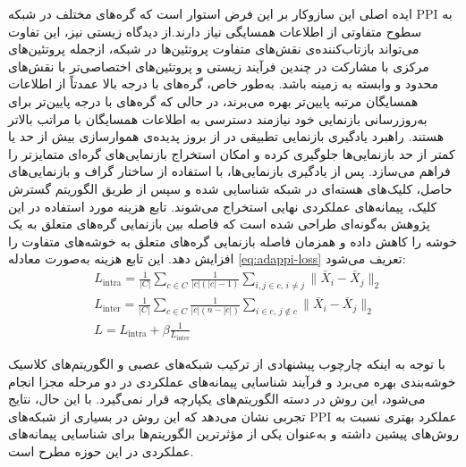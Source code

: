 ایده اصلی این سازوکار بر این فرض استوار است که گره‌های مختلف در شبکه PPI به سطوح متفاوتی از اطلاعات همسایگی نیاز دارند.از دیدگاه زیستی نیز، این تفاوت می‌تواند بازتاب‌کننده‌ی نقش‌های متفاوت پروتئین‌ها در شبکه، ازجمله پروتئین‌های مرکزی با مشارکت در چندین فرآیند زیستی و پروتئین‌های اختصاصی‌تر با نقش‌های محدود و وابسته به زمینه باشد. به‌طور خاص، گره‌های با درجه بالا عمدتاً از اطلاعات همسایگان مرتبه پایین‌تر بهره می‌برند، در حالی که گره‌های با درجه پایین‌تر برای به‌روزرسانی بازنمایی خود نیازمند دسترسی به اطلاعات همسایگان با مراتب بالاتر هستند. راهبرد یادگیری بازنمایی تطبیقی در  از بروز پدیده‌ی هموارسازی بیش از حد یا کمتر از حد بازنمایی‌ها جلوگیری کرده و امکان استخراج بازنمایی‌های گره‌ای متمایزتر را فراهم می‌سازد.
پس از یادگیری بازنمایی‌ها، با استفاده از ساختار گراف و بازنمایی‌های حاصل، کلیک‌های هسته‌ای در شبکه شناسایی شده و سپس از طریق الگوریتم گسترش کلیک، پیمانه‌های عملکردی نهایی استخراج می‌شوند. تابع هزینه مورد استفاده در این پژوهش به‌گونه‌ای طراحی شده است که فاصله بین بازنمایی گره‌های متعلق به یک خوشه را کاهش داده و همزمان فاصله بازنمایی گره‌های متعلق به خوشه‌های متفاوت را افزایش دهد. این تابع هزینه به‌صورت معادله \ref{eq:adappi-loss} تعریف می‌شود:
\begin{equation}
	\begin{aligned}
		& L_{\text{intra}} = \frac{1}{|C|} \sum_{c \in C} \frac{1}{|c|(|c|-1)} \sum_{i,j \in c,\, i \neq j} \lVert \bar{X}_i - \bar{X}_j \rVert_2 \\
		& L_{\text{inter}} = \frac{1}{|C|} \sum_{c \in C} \frac{1}{|c|(n-|c|)} \sum_{i \in c,\, j \notin c} \lVert \bar{X}_i - \bar{X}_j \rVert_2 \\
		& L = L_{\text{intra}} + \beta \frac{1}{L_{\text{inter}}}
	\end{aligned}
	\label{eq:adappi-loss}
\end{equation}

با توجه به اینکه چارچوب پیشنهادی  از ترکیب شبکه‌های عصبی و الگوریتم‌های کلاسیک خوشه‌بندی بهره می‌برد و فرآیند شناسایی پیمانه‌های عملکردی در دو مرحله مجزا انجام می‌شود، این روش در دسته الگوریتم‌های یکپارچه قرار نمی‌گیرد. با این حال، نتایج تجربی نشان می‌دهد که این روش در بسیاری از شبکه‌های PPI عملکرد بهتری نسبت به روش‌های پیشین داشته و به‌عنوان یکی از مؤثرترین الگوریتم‌ها برای شناسایی پیمانه‌های عملکردی در این حوزه مطرح است.




